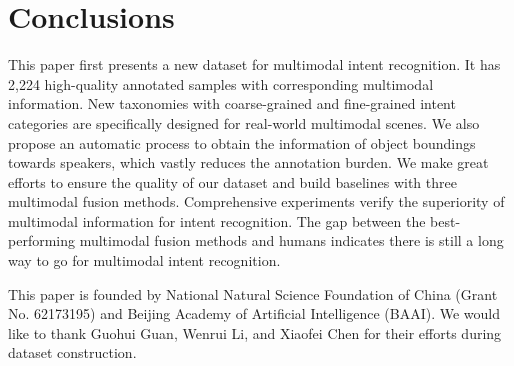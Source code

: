 \documentclass[sigconf,camera-ready]{acmart}
\begin{document}
\section{Conclusions}
This paper first presents a new dataset for multimodal intent recognition. It has 2,224 high-quality annotated samples with corresponding multimodal information. New taxonomies with coarse-grained and fine-grained intent categories are specifically designed for real-world multimodal scenes. We also propose an automatic process to obtain the information of object boundings towards speakers, which vastly reduces the annotation burden. We make great efforts to ensure the quality of our dataset and build baselines with three multimodal fusion methods. Comprehensive experiments verify the superiority of multimodal information for intent recognition. The gap between the best-performing multimodal fusion methods and humans indicates there is still a long way to go for multimodal intent recognition.
 

\begin{acks}
This paper is founded by National Natural Science Foundation of China (Grant No. 62173195) and Beijing Academy of Artificial Intelligence (BAAI). We would like to thank Guohui Guan, Wenrui Li, and Xiaofei Chen for their efforts during dataset construction.
\end{acks}


\balance

\end{document}
